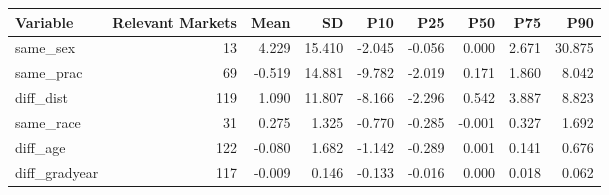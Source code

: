 \begin{table}[!h]
\centering
\begin{tabular}{lrrrrrrrr}
\toprule
Variable & Relevant Markets & Mean & SD & P10 & P25 & P50 & P75 & P90\\
\midrule
same\_sex & 13 & 4.229 & 15.410 & -2.045 & -0.056 & 0.000 & 2.671 & 30.875\\
same\_prac & 69 & -0.519 & 14.881 & -9.782 & -2.019 & 0.171 & 1.860 & 8.042\\
diff\_dist & 119 & 1.090 & 11.807 & -8.166 & -2.296 & 0.542 & 3.887 & 8.823\\
same\_race & 31 & 0.275 & 1.325 & -0.770 & -0.285 & -0.001 & 0.327 & 1.692\\
diff\_age & 122 & -0.080 & 1.682 & -1.142 & -0.289 & 0.001 & 0.141 & 0.676\\
\addlinespace
diff\_gradyear & 117 & -0.009 & 0.146 & -0.133 & -0.016 & 0.000 & 0.018 & 0.062\\
\bottomrule
\end{tabular}
\end{table}
